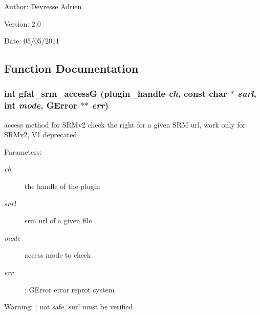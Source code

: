 \begin{Desc}
\item[Author:]Devresse Adrien \end{Desc}
\begin{Desc}
\item[Version:]2.0 \end{Desc}
\begin{Desc}
\item[Date:]05/05/2011 \end{Desc}


\subsection{Function Documentation}
\subsubsection{\setlength{\rightskip}{0pt plus 5cm}int gfal\_\-srm\_\-access\-G (plugin\_\-handle {\em ch}, const char $\ast$ {\em surl}, int {\em mode}, GError $\ast$$\ast$ {\em err})}\label{gfal__common__srm__access_8c_2d1197314163b3fd3b59e7d75579f1e9}


access method for SRMv2 check the right for a given SRM url, work only for SRMv2, V1 deprecated. 

\begin{Desc}
\item[Parameters:]
\begin{description}
\item[{\em ch}]the handle of the plugin \item[{\em surl}]srm url of a given file \item[{\em mode}]access mode to check \item[{\em err}]: GError error reprot system \end{description}
\end{Desc}
\begin{Desc}
\item[Warning:]: not safe, surl must be verified \end{Desc}
